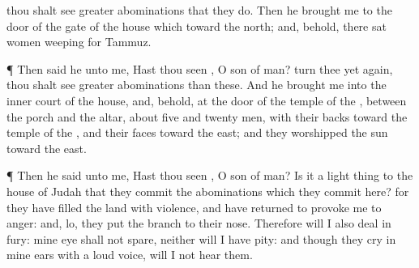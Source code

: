 {{} thou shalt
see
greater
abominations that they
do.
Then he
brought me to the
door of the
gate of the
{}
house which
{} toward the
north; and, behold, there
sat
women
weeping for
Tammuz.
\par }{\PP {}¶ Then
said he unto me, Hast thou
seen
{}, O
son of
man?
turn thee yet again,
{} thou shalt
see
greater
abominations than these.
And he
brought me into the
inner
court of the
{}
house, and, behold, at the
door of the
temple of the
{}, between the
porch and the
altar,
{} about
five and
twenty
men, with their
backs toward the
temple of the
{}, and their
faces toward the
east; and they
worshipped the
sun toward the
east.
\par }{\PP {}¶ Then he
said unto me, Hast thou
seen
{}, O
son of
man? Is it a light
thing to the
house of
Judah that they
commit the
abominations which they
commit here? for they have
filled the
land with
violence, and have
returned to provoke me to
anger: and, lo, they
put the
branch to their
nose.
Therefore will I also
deal in
fury: mine
eye shall not
spare, neither will I have
pity: and though they
cry in mine
ears with a
loud
voice,
{} will I not
hear them.

}
